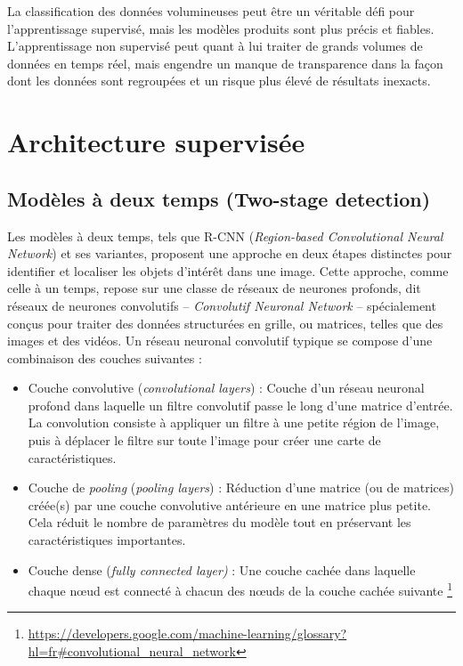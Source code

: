 \documentclass[12pt,twoside]{book}
\begin{document}
La classification des données volumineuses peut être un véritable défi pour l'apprentissage supervisé, mais les modèles produits sont plus précis et fiables. L'apprentissage non supervisé peut quant à lui traiter de grands volumes de données en temps réel, mais engendre un manque de transparence dans la façon dont les données sont regroupées et un risque plus élevé de résultats inexacts.

\section[Architecture supervisée]{Architecture supervisée}


\subsection{Modèles à deux temps (Two-stage detection)}

Les modèles à deux temps, tels que R-CNN (\textit{Region-based Convolutional Neural Network}) et ses variantes, proposent une approche en deux étapes distinctes pour identifier et localiser les objets d'intérêt dans une image. Cette approche, comme celle à un temps, repose sur une classe de réseaux de neurones profonds, dit réseaux de neurones convolutifs -- \textit{Convolutif Neuronal Network} -- spécialement conçus pour traiter des données structurées en grille, ou matrices, telles que des images et des vidéos. Un réseau neuronal convolutif typique se compose d'une combinaison des couches suivantes :

\newpage

\begin{itemize}
    \item Couche convolutive (\textit{convolutional layers}) : Couche d'un réseau neuronal profond dans laquelle un filtre convolutif passe le long d'une matrice d'entrée. La convolution consiste à appliquer un filtre à une petite région de l'image, puis à déplacer le filtre sur toute l'image pour créer une carte de caractéristiques.
    \item Couche de \textit{pooling} (\textit{pooling layers}) : Réduction d'une matrice (ou de matrices) créée(s) par une couche convolutive antérieure en une matrice plus petite. Cela réduit le nombre de paramètres du modèle tout en préservant les caractéristiques importantes.
    \item Couche dense (\textit{fully connected layer)} : Une couche cachée dans laquelle chaque nœud est connecté à chacun des nœuds de la couche cachée suivante \footnote{\url{https://developers.google.com/machine-learning/glossary?hl=fr\#convolutional_neural_network}}
\end{itemize}
\end{document}
